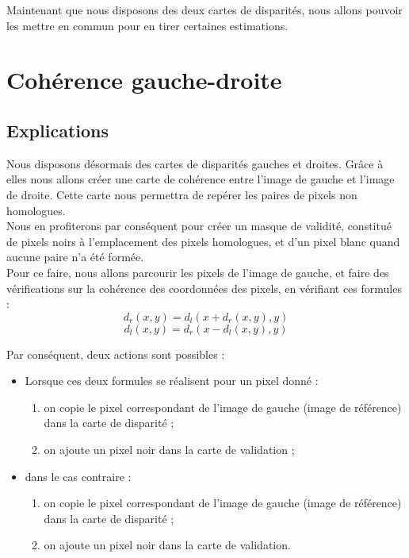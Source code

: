 \documentclass[a4paper]{article}
\begin{document}
Maintenant que nous disposons des deux cartes de disparités, nous allons pouvoir les mettre en commun pour en tirer certaines estimations.

\clearpage
\section{Cohérence gauche-droite}

\subsection{Explications}
Nous disposons désormais des cartes de disparités gauches et droites. Grâce à elles nous allons créer une carte de cohérence entre l'image de gauche et l'image de droite. Cette carte nous permettra de repérer les paires de pixels non homologues.\\
Nous en profiterons par conséquent pour créer un masque de validité, constitué de pixels noirs à l'emplacement des pixels homologues, et d'un pixel blanc quand aucune paire n'a été formée.\\

Pour ce faire, nous allons parcourir les pixels de l'image de gauche, et faire des vérifications sur la cohérence des coordonnées des pixels, en vérifiant ces formules :
\begin{equation}
  d_r(x,y) = d_l(x+d_r(x,y),y)
\end{equation}
\begin{equation}
  d_l(x,y) = d_r(x-d_l(x,y),y)
\end{equation}

Par conséquent, deux actions sont possibles :
\begin{itemize}
\item Lorsque ces deux formules se réalisent pour un pixel donné :
  \begin{enumerate}
    \item on copie le pixel correspondant de l'image de gauche (image de référence) dans la carte de disparité ;
    \item on ajoute un pixel noir dans la carte de validation ;
  \end{enumerate}
\item dans le cas contraire :
  \begin{enumerate}
    \item on copie le pixel correspondant de l'image de gauche (image de référence) dans la carte de disparité ;
    \item on ajoute un pixel noir dans la carte de validation.
  \end{enumerate}
\end{itemize}
\end{document}
